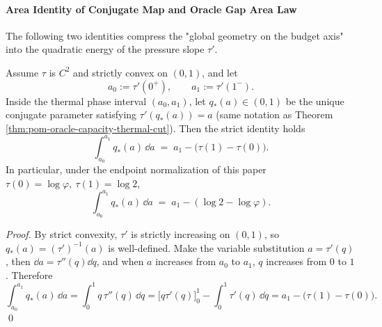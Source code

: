 \paragraph{Area Identity of Conjugate Map and Oracle Gap Area Law}
The following two identities compress the "global geometry on the budget axis" into the quadratic energy of the pressure slope \(\tau'\).

\begin{theorem}\label{thm:pom-oracle-qstar-area-identity}
Assume \(\tau\) is \(C^2\) and strictly convex on \((0,1)\), and let
\[
a_0:=\tau'(0^+),\qquad a_1:=\tau'(1^-).
\]
Inside the thermal phase interval \((a_0,a_1)\), let \(q_*(a)\in(0,1)\) be the unique conjugate parameter satisfying \(\tau'(q_*(a))=a\) (same notation as Theorem \ref{thm:pom-oracle-capacity-thermal-cut}).
Then the strict identity holds
\[
\boxed{\;
\int_{a_0}^{a_1} q_*(a)\,\dd a \;=\; a_1-\bigl(\tau(1)-\tau(0)\bigr).\;}
\]
In particular, under the endpoint normalization of this paper \(\tau(0)=\log\varphi,\ \tau(1)=\log 2\),
\[
\int_{a_0}^{a_1} q_*(a)\,\dd a \;=\; a_1-(\log 2-\log\varphi).
\]
\end{theorem}
\begin{proof}
By strict convexity, \(\tau'\) is strictly increasing on \((0,1)\), so \(q_*(a)=(\tau')^{-1}(a)\) is well-defined.
Make the variable substitution \(a=\tau'(q)\), then \(\dd a=\tau''(q)\dd q\), and when \(a\) increases from \(a_0\) to \(a_1\), \(q\) increases from \(0\) to \(1\).
Therefore
\[
\int_{a_0}^{a_1} q_*(a)\,\dd a
=\int_{0}^{1} q\,\tau''(q)\,\dd q
=\bigl[q\tau'(q)\bigr]_{0}^{1}-\int_{0}^{1}\tau'(q)\,\dd q
=a_1-\bigl(\tau(1)-\tau(0)\bigr).
\]
\qed
\end{proof}


